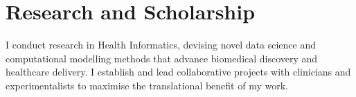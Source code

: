 \documentclass[a4paper]{article}
\begin{document}






\section*{Research and Scholarship}

I conduct research in Health Informatics, devising novel data science and computational modelling methods that advance biomedical discovery and healthcare delivery.
I establish and lead collaborative projects with clinicians and experimentalists to maximise the translational benefit of my work.
\end{document}
